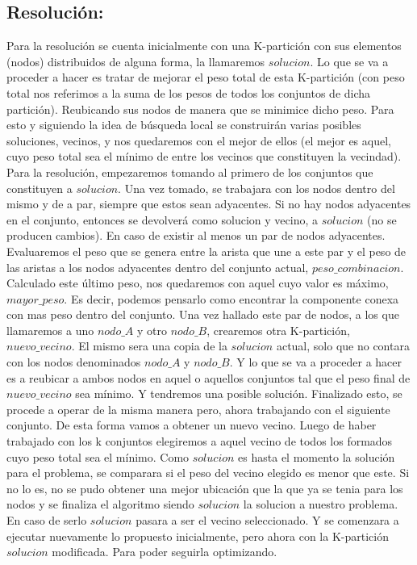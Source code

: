 \documentclass[a4paper]{article}
\begin{document}
\subsection{Resoluci\'on:}

Para la resoluci\'on se cuenta inicialmente con una K-partici\'on con sus elementos (nodos) distribuidos de alguna forma, la llamaremos $solucion$. Lo que se va a proceder a hacer es tratar de mejorar el peso total de esta K-partici\'on (con peso total nos referimos a la suma de los pesos de todos los conjuntos de dicha partici\'on). Reubicando sus nodos de manera que se minimice dicho peso.
Para esto y siguiendo la idea de b\'usqueda local se construir\'an varias posibles soluciones, vecinos, y nos quedaremos con el mejor de ellos (el mejor es aquel, cuyo peso total sea el m\'inimo de entre los vecinos que constituyen la vecindad).  
Para la resoluci\'on, empezaremos tomando al primero de los conjuntos  que constituyen a $solucion$. Una vez tomado, se trabajara con los nodos dentro del mismo y de a par, siempre que estos sean adyacentes. Si no hay nodos adyacentes en el conjunto, entonces se devolver\'a como solucion y vecino, a $solucion$ (no se producen cambios). En caso de existir al menos un  par de nodos adyacentes. Evaluaremos el peso que se genera entre la arista que une a este par y el peso de las aristas a los nodos adyacentes dentro del conjunto actual, $peso\_combinacion$. Calculado este \'ultimo peso, nos quedaremos con aquel cuyo valor es m\'aximo, $mayor\_peso$. Es decir, podemos pensarlo como encontrar la componente conexa con mas peso dentro del conjunto. Una vez hallado este par de nodos, a los que llamaremos a uno $nodo\_A$ y otro $nodo\_B$, crearemos otra K-partici\'on, $nuevo\_vecino$. El mismo sera una copia de la $solucion$ actual, solo que no contara con los nodos denominados $nodo\_A$ y $nodo\_B$.  Y lo que se va a proceder a hacer es a reubicar a ambos nodos en aquel o aquellos conjuntos tal que el peso final de $nuevo\_vecino$ sea m\'inimo. Y tendremos una posible soluci\'on. Finalizado esto, se procede a operar de la misma manera pero, ahora trabajando con el siguiente conjunto. De esta forma vamos a obtener un nuevo vecino. Luego de haber trabajado con los k conjuntos elegiremos a aquel vecino de todos los formados cuyo peso total sea el m\'inimo. Como $solucion$ es hasta el momento la soluci\'on para el problema, se comparara si el peso del vecino elegido es menor que este. Si no lo es, no se pudo obtener una mejor ubicaci\'on  que la que ya se tenia para los nodos y se finaliza el algoritmo siendo $solucion$ la solucion a nuestro problema. En caso de serlo $solucion$ pasara a ser el vecino seleccionado. Y se comenzara a ejecutar nuevamente lo propuesto inicialmente, pero ahora con la K-partici\'on $solucion$ modificada. Para poder seguirla optimizando.
\end{document}
